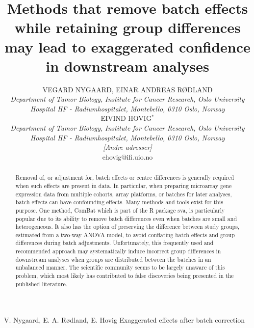 \documentclass{bio}
\newcommand\NB[1]{\textcolor{NBcol}{\textit{#1}}}
\newcommand\NOTE[1]{\NB{[#1]}}
\begin{document}

\title{Methods that remove batch effects while retaining group differences may lead
to exaggerated confidence in downstream analyses
}

\author{VEGARD NYGAARD, EINAR ANDREAS RØDLAND\\[4pt]
\textit{Department of Tumor Biology,
Institute for Cancer Research,
Oslo University Hospital HF - Radiumhospitalet,
Montebello,
0310 Oslo,
Norway}
\\[8pt]
EIVIND HOVIG$^\ast$\\[4pt]
\textit{Department of Tumor Biology,
Institute for Cancer Research,
Oslo University Hospital HF - Radiumhospitalet,
Montebello,
0310 Oslo,
Norway}
\\[2pt]
\textit{\NOTE{Andre adresser}}
\\[2pt]
{ehovig@ifi.uio.no}}

\markboth%
{V. Nygaard, E. A. Rødland, E. Hovig}
{Exaggerated effects after batch correction}


\maketitle



\begin{abstract}
{Removal of, or adjustment for, batch effects or centre differences is generally required when such effects are present in data. In particular, when preparing microarray gene expression data from multiple cohorts, array platforms, or batches for later analyses, batch effects can have confounding effects. Many methods and tools exist for this purpose. One method, ComBat which is part of the R package sva, is particularly popular due to its ability to remove batch differences even when batches are small and heterogeneous. It also has the option of preserving the difference between study groups, estimated from a two-way ANOVA model, to avoid conflating batch effects and group differences during batch adjustments. Unfortunately, this frequently used and recommended approach may systematically induce incorrect group differences in downstream analyses when groups are distributed between the batches in an unbalanced manner. The scientific community seems to be largely unaware of this problem, which most likely has contributed to false discoveries being presented in the published literature.
}
\end{abstract}
\end{document}
